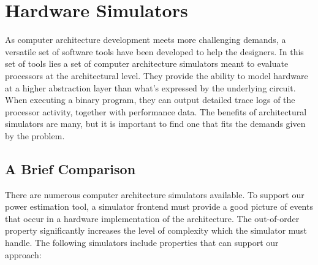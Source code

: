 \section{Hardware Simulators}

As computer architecture development meets more challenging demands, a versatile
set of software tools have been developed to help the designers. In this set of
tools lies a set of computer architecture simulators meant to evaluate
processors at the architectural level.  They provide the ability to model
hardware at a higher abstraction layer than what's expressed by the underlying
circuit. When executing a binary program, they can output detailed trace logs of
the processor activity, together with performance data.  The benefits of
architectural simulators are many, but it is important to find one that fits the
demands given by the problem.

\subsection{A Brief Comparison}
\label{subsec:simulators}
There are numerous computer architecture simulators available. To support our
power estimation tool, a simulator frontend must provide a good picture of
events that occur in a hardware implementation of the architecture. The
out-of-order property significantly increases the level of complexity which the
simulator must handle. The following simulators include properties that can
support our approach:

